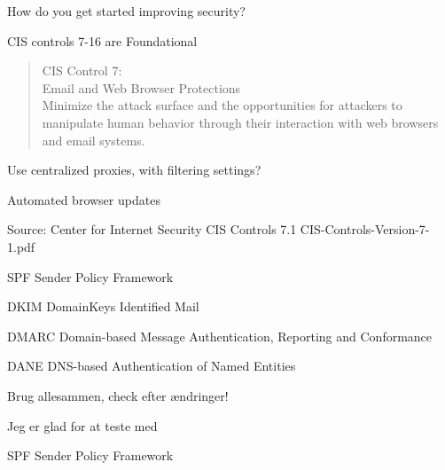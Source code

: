 \documentclass[Screen16to9,17pt]{foils}
\begin{document}
How do you get started improving security?



CIS controls 7-16 are Foundational

\begin{quote}
CIS Control 7:\\
Email and Web Browser Protections\\
Minimize the attack surface and the opportunities for attackers to manipulate human behavior through their interaction with web browsers and email systems.
\end{quote}

\begin{list1}
\item Use centralized proxies, with filtering settings?
\item Automated browser updates
\item
\item
\end{list1}

Source: Center for Internet Security CIS Controls 7.1 CIS-Controls-Version-7-1.pdf




\begin{list2}
\item SPF Sender Policy Framework\\ {\footnotesize{}}
\item DKIM DomainKeys Identified Mail\\
{\footnotesize{}}
\item DMARC Domain-based Message Authentication, Reporting and Conformance\\
{\footnotesize{}}
\item DANE DNS-based Authentication of Named Entities\\ {\footnotesize{}}
\item Brug allesammen, check efter ændringer!
\end{list2}

\centerline{Jeg er glad for at teste med }



 SPF Sender Policy Framework\\ {\footnotesize{}}
\end{document}
